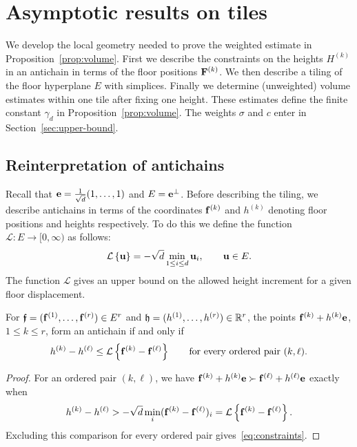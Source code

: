 \documentclass[11pt,letterpaper]{article}
\begin{document}
\section{Asymptotic results on tiles}\label{sec:counting_proof}

We develop the local geometry needed to prove the weighted estimate in Proposition~\ref{prop:volume}. First we describe the constraints on the heights $H^{(k)}$ in an antichain in terms of the floor positions $\mathbf F^{(k)}$. We then describe a tiling of the floor hyperplane $E$ with simplices. Finally we determine (unweighted) volume estimates within one tile after fixing one height. These estimates define the finite constant $\gamma_d$ in Proposition~\ref{prop:volume}. The weights $\sigma$ and $c$ enter in Section~\ref{sec:upper-bound}.
\subsection{Reinterpretation of antichains}
Recall that $\mathbf e=\frac{1}{\sqrt d}(1,\ldots,1)$ and $E=\mathbf e^\perp$.
Before describing the tiling, we describe antichains in terms of the coordinates $\mathbf f^{(k)}$ and $h^{(k)}$ denoting floor positions and heights respectively. To do this we define the function $\mathcal L:E\to[0,\infty)$ as follows:
\[
      \mathcal L\left\{\mathbf u\right\}=-\sqrt d\min_{1\le i\le d}\mathbf u_i, \qquad  \mathbf u\in E.
\]
The function $\mathcal L$ gives an upper bound on the allowed height increment for a given floor displacement.

\begin{proposition} \label{prop:L_definition}
      For $\bm{\mathfrak f}=(\mathbf f^{(1)},\ldots,\mathbf f^{(r)})\in E^r$ and $\mathfrak h=(h^{(1)},\ldots,h^{(r)})\in\mathbb R^r$, the points $\mathbf f^{(k)}+h^{(k)}\mathbf e$, $1\le k\le r$, form an antichain if and only if
      \begin{equation}\label{eq:constraints}
            h^{(k)}-h^{(\ell)}\le\mathcal L\left\{\mathbf f^{(k)}-\mathbf f^{(\ell)}\right\} \qquad\text{for every ordered pair }(k,\ell).
      \end{equation}
\end{proposition}
\begin{proof}
      For an ordered pair $(k,\ell)$, we have $\mathbf f^{(k)}+h^{(k)}\mathbf e \succ \mathbf f^{(\ell)}+h^{(\ell)}\mathbf e$ exactly when
      \[
            h^{(k)}-h^{(\ell)}>
            -\sqrt d\min_i(\mathbf f^{(k)}-\mathbf f^{(\ell)})_i
            =\mathcal L\left\{\mathbf f^{(k)}-\mathbf f^{(\ell)}\right\}.
      \]
      Excluding this comparison for every ordered pair gives~\eqref{eq:constraints}.
\end{proof}
\end{document}
